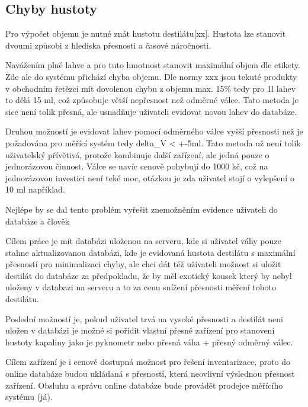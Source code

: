 \subsection{Chyby hustoty}

Pro výpočet objemu je nutné znát hustotu destilátu[xx]. Hustota lze stanovit dvoumi způsobi z hlediska přesnosti a časové náročnosti.


Navážením plné lahve a pro tuto hmotnost stanovit maximální objem dle etikety. Zde ale do systému přichází chyba objemu. Dle normy xxx jsou tekuté produkty v obchodním řetězci mít dovolenou chybu z objemu max. 15\% tedy pro 1l lahev to dělá 15 ml, což způsobuje větší nepřesnost než odměrné válce. Tato metoda je sice není tolik přesná, ale usnadňuje uživateli evidovat novou lahev do databáze.

Druhou možností je evidovat lahev pomocí odměrného válce vyšší přesnosti než je požadována pro měřící systém tedy delta\_V < +-5ml. Tato metoda už není tolik uživatelský přívětivá, protože kombinuje další zařízení, ale jedná pouze o jednorázovou činnost. Válce se navíc cenově pohybují do 1000 kč, což na jednorázovou investici není teké moc, otázkou je zda uživatel stojí o vylepšení o 10 ml například.

Nejlépe by se dal tento problém vyřešit znemožněním evidence uživateli do databáze a člověk

Cílem práce je mít databázi uloženou na serveru, kde si uživatel váhy pouze stahne aktualizovanou databázi, kde je evidovaná hustota destilátu s maximální přesností pro minimalizaci chyby, ale chci dát též uživateli možnost si uložit destilát do databáze za předpokladu, že by měl exotický kousek který by nebyl uloženy v databazi na serveru a to za cenu snížení přesnosti měření tohoto destilátu. 

Poslední možností je, pokud uživatel trvá na vysoké přesnosti a destilát neni uložen v databázi je možné si pořídit vlastní přesné zařízení pro stanovení hustoty kapaliny jako je pyknometr nebo přesná váha + přesný odměrný válec.

Cílem zařízení je i cenově dostupná možnost pro řešení inventarizace, proto do online databáze budou ukládaná s přesností, která neovlivní výslednou přesnost zařízení. Obsluhu a správu online databáze bude provádět prodejce měřícího systému (já).


